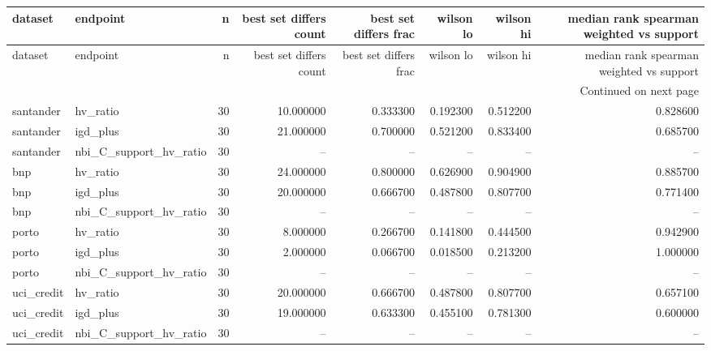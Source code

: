 \begin{landscape}
\begin{center}\label{tab:s9cost}\end{center}
\begingroup\tiny\setlength{\tabcolsep}{2.5pt}
\begin{longtable}{llrrrrrr}
\toprule
dataset & endpoint & n & best set differs count & best set differs frac & wilson lo & wilson hi & median rank spearman weighted vs support \\
\midrule
\endfirsthead
\toprule
dataset & endpoint & n & best set differs count & best set differs frac & wilson lo & wilson hi & median rank spearman weighted vs support \\
\midrule
\endhead
\midrule
\multicolumn{8}{r}{Continued on next page} \\
\midrule
\endfoot
\bottomrule
\endlastfoot
santander & hv\_ratio & 30 & 10.000000 & 0.333300 & 0.192300 & 0.512200 & 0.828600 \\
santander & igd\_plus & 30 & 21.000000 & 0.700000 & 0.521200 & 0.833400 & 0.685700 \\
santander & nbi\_C\_support\_hv\_ratio & 30 & -- & -- & -- & -- & -- \\
bnp & hv\_ratio & 30 & 24.000000 & 0.800000 & 0.626900 & 0.904900 & 0.885700 \\
bnp & igd\_plus & 30 & 20.000000 & 0.666700 & 0.487800 & 0.807700 & 0.771400 \\
bnp & nbi\_C\_support\_hv\_ratio & 30 & -- & -- & -- & -- & -- \\
porto & hv\_ratio & 30 & 8.000000 & 0.266700 & 0.141800 & 0.444500 & 0.942900 \\
porto & igd\_plus & 30 & 2.000000 & 0.066700 & 0.018500 & 0.213200 & 1.000000 \\
porto & nbi\_C\_support\_hv\_ratio & 30 & -- & -- & -- & -- & -- \\
uci\_credit & hv\_ratio & 30 & 20.000000 & 0.666700 & 0.487800 & 0.807700 & 0.657100 \\
uci\_credit & igd\_plus & 30 & 19.000000 & 0.633300 & 0.455100 & 0.781300 & 0.600000 \\
uci\_credit & nbi\_C\_support\_hv\_ratio & 30 & -- & -- & -- & -- & -- \\
\end{longtable}\endgroup

\end{landscape}
